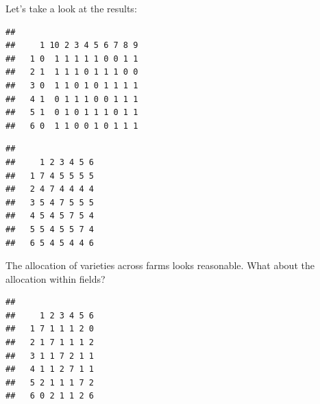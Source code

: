 \documentclass[
]{book}
\newenvironment{Shaded}{\begin{snugshade}}{\end{snugshade}}
\newcommand{\FunctionTok}[1]{\textcolor[rgb]{0.00,0.00,0.00}{#1}}
\newcommand{\NormalTok}[1]{#1}
\newcommand{\SpecialCharTok}[1]{\textcolor[rgb]{0.00,0.00,0.00}{#1}}
\begin{document}
Let's take a look at the results:

\begin{Shaded}
\end{Shaded}

\begin{verbatim}
##    
##     1 10 2 3 4 5 6 7 8 9
##   1 0  1 1 1 1 1 0 0 1 1
##   2 1  1 1 1 0 1 1 1 0 0
##   3 0  1 1 0 1 0 1 1 1 1
##   4 1  0 1 1 1 0 0 1 1 1
##   5 1  0 1 0 1 1 1 0 1 1
##   6 0  1 1 0 0 1 0 1 1 1
\end{verbatim}

\begin{Shaded}
\end{Shaded}

\begin{verbatim}
##    
##     1 2 3 4 5 6
##   1 7 4 5 5 5 5
##   2 4 7 4 4 4 4
##   3 5 4 7 5 5 5
##   4 5 4 5 7 5 4
##   5 5 4 5 5 7 4
##   6 5 4 5 4 4 6
\end{verbatim}

The allocation of varieties across farms looks reasonable. What about the allocation within fields?

\begin{Shaded}
\end{Shaded}

\begin{verbatim}
##    
##     1 2 3 4 5 6
##   1 7 1 1 1 2 0
##   2 1 7 1 1 1 2
##   3 1 1 7 2 1 1
##   4 1 1 2 7 1 1
##   5 2 1 1 1 7 2
##   6 0 2 1 1 2 6
\end{verbatim}
\end{document}
